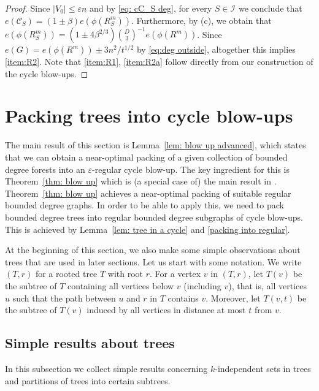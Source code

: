 \documentclass[a4paper, 11pt, reqno]{amsart}
\numberwithin{equation}{section}
\newcommand{\1}{{\rm 1\hspace*{-0.4ex}%
\rule{0.1ex}{1.52ex}\hspace*{0.2ex}}}
\newcommand{\cC}{\mathcal{C}}
\newcommand{\cI}{\mathcal{I}}
\renewcommand{\epsilon}{\varepsilon}
\newcommand{\COMMENT}[1]{}
\begin{document}
\begin{proof}
Since $|V_0|\leq \epsilon n$ and by \eqref{eq: cC_S deg},
for every $S\in \cI$ we conclude that 
$e(\cC_S)=(1\pm \beta)e(\phi(R^m_S))$.
Furthermore,
by (c), we obtain that
$e(\phi(R^m_S))=(1\pm 4\beta^{2/3})\binom{D}{3}^{-1}e(\phi(R^m))$.
Since $e(G) = e(\phi(R^m)) \pm 3n^2/t^{1/2}$ by \eqref{eq:deg outside}, altogether this implies \ref{item:R2}.\COMMENT{
$e(G)
\geq e(\phi(R^m))
\geq \sum_{C\in \cC}e(C)\geq e(G)- 3n^2/t^{1/2}$.
}
Note that \ref{item:R1}, \ref{item:R2a} follow directly from our construction of the cycle blow-ups.
\end{proof}


\section{Packing trees into cycle blow-ups} \label{sec: trees}
The main result of this section is Lemma~\ref{lem: blow up advanced}, which states that we can obtain a near-optimal packing of a given collection of bounded degree forests into an $\epsilon$-regular cycle blow-up. The key ingredient for this is Theorem~\ref{thm: blow up} which is (a special case of) the main result in \cite{KKOT16}. Theorem~\ref{thm: blow up} achieves a near-optimal packing of suitable regular bounded degree graphs. In order to be able to apply this, we need to pack bounded degree trees into regular bounded degree subgraphs of cycle blow-ups. This is achieved by Lemma~\ref{lem: tree in a cycle} and \ref{packing into regular}.

At the beginning of this section, we also make some simple observations about trees that are used in later sections.
Let us start with some notation.
We write $(T,r)$ for a rooted tree $T$ with root $r$.
For a vertex $v$ in $(T,r)$, 
let $T(v)$ be the subtree of $T$ containing all vertices below $v$ (including $v$), that is, all vertices $u$ such that the path between $u$ and $r$ in $T$ contains $v$.
Moreover, let $T(v,t)$ be the subtree of $T(v)$ induced by all vertices in distance at most $t$ from $v$. 


\subsection{Simple results about trees}
In this subsection we collect simple results concerning $k$-independent sets in trees and partitions of trees into certain subtrees.
\end{document}
